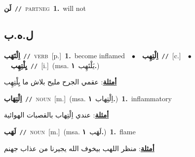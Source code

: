 \documentclass[10pt,a4paper,twoside]{article} %
\begin{document}
\begin{multicols}{2}
{\setlength\topsep{0pt}\textbf{\foreignlanguage{arabic}{لَن}}\ {\color{gray}\texttt{//}\color{black}}\ \textsc{part\textunderscore neg}\ \textbf{1.}~will not\ } \vspace{2mm}

\vspace{-3mm}
\subsection*{\color{blue}\foreignlanguage{arabic}{ل.ه.ب}\color{blue}{}} 

{\setlength\topsep{0pt}\textbf{\foreignlanguage{arabic}{اِلْتَهَب}}\ {\color{gray}\texttt{//}\color{black}}\ \textsc{verb}\ [p.]\ \textbf{1.}~become inflamed\ \ $\bullet$\ \ \setlength\topsep{0pt}\textbf{\foreignlanguage{arabic}{اِلْتِهِب}}\ {\color{gray}\texttt{//}\color{black}}\ [c.]\ \ $\bullet$\ \ \setlength\topsep{0pt}\textbf{\foreignlanguage{arabic}{يِلْتِهِب}}\ {\color{gray}\texttt{//}\color{black}}\ [i.]\ \color{gray}(msa. \foreignlanguage{arabic}{يَلْتَهِب}~\foreignlanguage{arabic}{\textbf{١.}})\color{black}\  \begin{flushright}\color{gray}\foreignlanguage{arabic}{\textbf{\underline{\foreignlanguage{arabic}{أمثلة}}}: عقمي الجرح مليح بلاش ما يِلْتِهِب}\end{flushright}\color{black}} \vspace{2mm}

{\setlength\topsep{0pt}\textbf{\foreignlanguage{arabic}{اِلْتِهَاب}}\ {\color{gray}\texttt{//}\color{black}}\ \textsc{noun}\ [m.]\ \color{gray}(msa. \foreignlanguage{arabic}{اِلْتِهاب}~\foreignlanguage{arabic}{\textbf{١.}})\color{black}\ \textbf{1.}~inflammatory\  \begin{flushright}\color{gray}\foreignlanguage{arabic}{\textbf{\underline{\foreignlanguage{arabic}{أمثلة}}}: عندي اِلْتِهاب بالقصبات الهوائية}\end{flushright}\color{black}} \vspace{2mm}

{\setlength\topsep{0pt}\textbf{\foreignlanguage{arabic}{لَهَب}}\ {\color{gray}\texttt{//}\color{black}}\ \textsc{noun}\ [m.]\ \color{gray}(msa. \foreignlanguage{arabic}{لَهَب}~\foreignlanguage{arabic}{\textbf{١.}})\color{black}\ \textbf{1.}~flame\  \begin{flushright}\color{gray}\foreignlanguage{arabic}{\textbf{\underline{\foreignlanguage{arabic}{أمثلة}}}: منظر اللهب بيخوف الله يجيرنا من عذاب جهنم}\end{flushright}\color{black}} \vspace{2mm}


\end{multicols}
\end{document}
